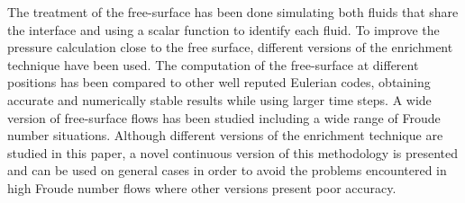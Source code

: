 The treatment of the free-surface has been done simulating both fluids that share the interface and using a scalar function to identify each fluid. To improve the pressure calculation close to the free surface, different versions of the enrichment technique \cite{Coppola05} have been used. The computation of the free-surface at different positions has been compared to other well reputed Eulerian codes, obtaining accurate and numerically stable results while using larger time steps. A wide version of free-surface flows has been studied including a wide range of Froude number situations. Although different versions of the enrichment technique are studied in this paper, a novel continuous version of this methodology is presented and can be used on general cases in order to avoid the problems encountered in high Froude number flows where other versions present poor accuracy. 